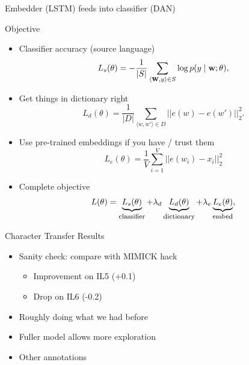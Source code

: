 \documentclass[compress]{beamer}
\newcommand{\vect}[1]{\bm{\mathbf{#1}}}
\newcommand{\bm}[1]{\mbox{\boldmath$#1$}}
\newcommand{\explain}[2]{\underbrace{#2}_{\mbox{\footnotesize{#1}}}}
\newcommand{\fsi}[2]{
\begin{frame}[plain]
\vspace*{-1pt}
\makebox[\linewidth]{\texttt{[image: \#1]}}
\begin{center}
#2
\end{center}
\end{frame}
}
\begin{document}
\fsi{clwe/architecture}{Embedder (LSTM) feeds into classifier (DAN)}

\begin{frame}{Objective}

  \begin{itemize}
    \item Classifier accuracy (source language)
\begin{equation}
    L_s(\theta) = -\frac{1}{|S|}\sum_{\langle \vect{w}, y \rangle \in S}
    \log p(y \mid \vect{w}; \theta),
\end{equation}
    \item Get things in dictionary right
      \begin{equation}
        L_d(\theta) = \frac{1}{|D|}\sum_{\langle w, w' \rangle \in D}
        ||e(w) - e(w')||_2^2.
      \end{equation}
      \item Use pre-trained embeddings if you have / trust them
        \begin{equation}
          L_e(\theta) = \frac{1}{V} \sum_{i=1}^V ||e(w_i) - x_i||_2^2
        \end{equation}
        \item Complete objective
         \begin{equation}
  L(\theta) = \explain{classifier}{L_s(\theta)} + \lambda_d \explain{dictionary}{L_d(\theta)} + \lambda_e \explain{embed}{L_e(\theta)},
\end{equation}
  \end{itemize}

\end{frame}

\begin{frame}{Character Transfer Results}

  \begin{itemize}
    \item Sanity check: compare with MIMICK hack
      \begin{itemize}
        \item Improvement on IL5 (+0.1)
        \item Drop on IL6 (-0.2)
      \end{itemize}
      \pause
      \item Roughly doing what we had before
      \item Fuller model allows more exploration
      \item Other annotations
  \end{itemize}

\end{frame}
\end{document}
